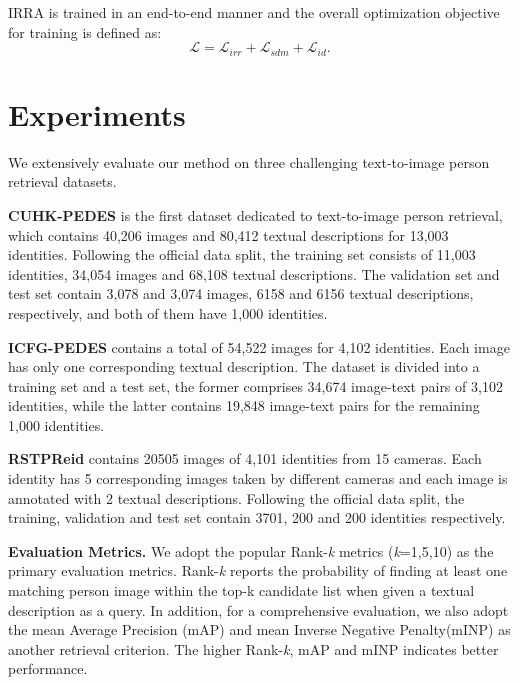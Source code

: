 \documentclass[10pt,twocolumn,letterpaper]{article}
\begin{document}
IRRA is trained in an end-to-end manner and the overall optimization objective for training is defined as:
\begin{equation}
  \mathcal{L} = \mathcal{L}_{irr} + \mathcal{L}_{sdm} + \mathcal{L}_{id}. 
\end{equation}

\section{Experiments}
We extensively evaluate our method on three challenging text-to-image person retrieval datasets.

\textbf{CUHK-PEDES} \cite{li2017person} is the first dataset dedicated to text-to-image person retrieval, which contains 40,206 images and 80,412 textual descriptions for 13,003 identities. Following the official data split, the training set consists of 11,003 identities, 34,054 images and 68,108 textual descriptions. The validation set and test set contain 3,078 and 3,074 images, 6158 and 6156 textual descriptions, respectively, and both of them have 1,000 identities.

\textbf{ICFG-PEDES} \cite{ding2021semantically} contains a total of 54,522 images for 4,102 identities. Each image has only one corresponding textual description. The dataset is divided into a training set and a test set, the former comprises 34,674 image-text pairs of 3,102 identities, while the latter contains 19,848 image-text pairs for the remaining 1,000 identities.

\textbf{RSTPReid} \cite{zhu2021dssl} contains 20505 images of 4,101 identities from 15 cameras. Each identity has 5 corresponding images taken by different cameras and each image is annotated with 2 textual descriptions. Following the official data split, the training, validation and test set contain 3701, 200 and 200 identities respectively.


\textbf{Evaluation Metrics.} We adopt the popular Rank-\textit{k} metrics (\textit{k}=1,5,10) as the primary evaluation metrics. Rank-\textit{k} reports the probability of finding at least one matching person image within the top-k candidate list when given a textual description as a query. In addition, for a comprehensive evaluation, we also adopt the mean Average Precision (mAP) and mean Inverse Negative Penalty(mINP)\cite{ye2021deep} as another retrieval criterion. The higher Rank-\textit{k}, mAP and mINP indicates better performance.
\end{document}
